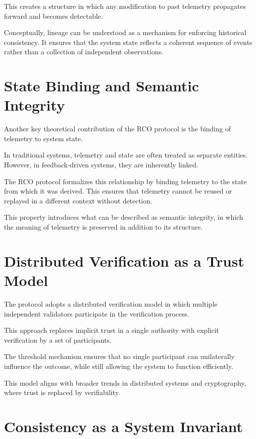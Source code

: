 This creates a structure in which any modification to past telemetry propagates forward and becomes detectable.

Conceptually, lineage can be understood as a mechanism for enforcing historical consistency. It ensures that the system state reflects a coherent sequence of events rather than a collection of independent observations.

\section{State Binding and Semantic Integrity}

Another key theoretical contribution of the RCO protocol is the binding of telemetry to system state.

In traditional systems, telemetry and state are often treated as separate entities. However, in feedback-driven systems, they are inherently linked.

The RCO protocol formalizes this relationship by binding telemetry to the state from which it was derived. This ensures that telemetry cannot be reused or replayed in a different context without detection.

This property introduces what can be described as semantic integrity, in which the meaning of telemetry is preserved in addition to its structure.

\section{Distributed Verification as a Trust Model}

The protocol adopts a distributed verification model in which multiple independent validators participate in the verification process.

This approach replaces implicit trust in a single authority with explicit verification by a set of participants.

The threshold mechanism ensures that no single participant can unilaterally influence the outcome, while still allowing the system to function efficiently.

This model aligns with broader trends in distributed systems and cryptography, where trust is replaced by verifiability.

\section{Consistency as a System Invariant}

